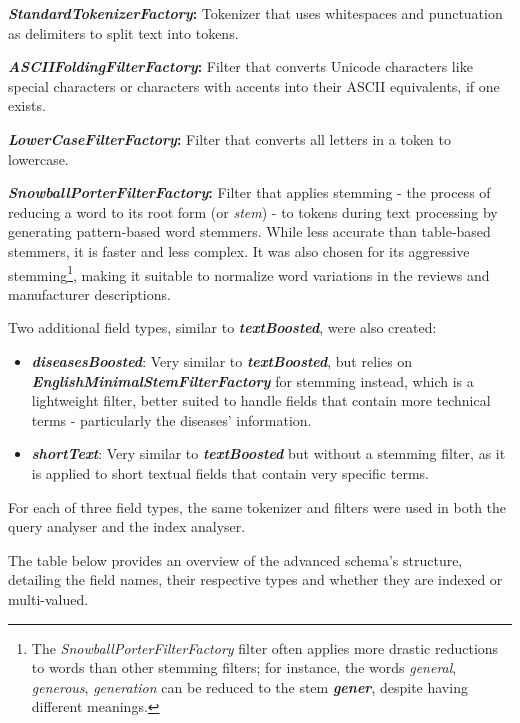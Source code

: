 \documentclass[sigconf]{acmart}
\begin{document}
\begin{arrowlist}
	\item \textbf{\textit{StandardTokenizerFactory}:} Tokenizer that uses whitespaces and punctuation as delimiters to split text into tokens.
        \item \textbf{\textit{ASCIIFoldingFilterFactory}:} Filter that 
    converts Unicode characters like special characters or characters with accents into their ASCII equivalents, if one exists.
	\item \textbf{\textit{LowerCaseFilterFactory}:} Filter that converts all letters in a token to lowercase.
	\item \textbf{\textit{SnowballPorterFilterFactory}:} Filter that applies stemming\cite{stemming} - the process of reducing a word to its root form (or \textit{stem}) - to tokens during text processing by generating pattern-based word stemmers. While less accurate than table-based stemmers, it is faster and less complex. It was also chosen for its aggressive stemming\footnote{The \textit{SnowballPorterFilterFactory} filter often applies more drastic reductions to words than other stemming filters; for instance, the words \textit{general}, \textit{generous}, \textit{generation} can be reduced to the stem \textit{\textbf{gener}}, despite having different meanings.}, making it suitable to normalize word variations in the reviews and manufacturer descriptions.
\end{arrowlist}

Two additional field types, similar to \textbf{\textit{textBoosted}}, were also created:

\begin{itemize}
        \item \textbf{\textit{diseasesBoosted}}: Very similar to 
    \textbf{\textit{textBoosted}}, but relies on \textbf{\textit{EnglishMinimalStemFilterFactory}} for stemming instead, which is a lightweight filter, better suited to handle fields that contain more technical terms - particularly the diseases' information.
	\item \textbf{\textit{shortText}}: Very similar to \textbf{\textit{textBoosted}} but without a stemming filter, as it is applied to short textual fields that contain very specific terms.
\end{itemize}

For each of three field types, the same tokenizer and filters were used in both the query analyser and the index analyser.

The table below provides an overview of the advanced schema's structure, detailing the field names, their respective types and whether they are indexed or multi-valued.
\end{document}
